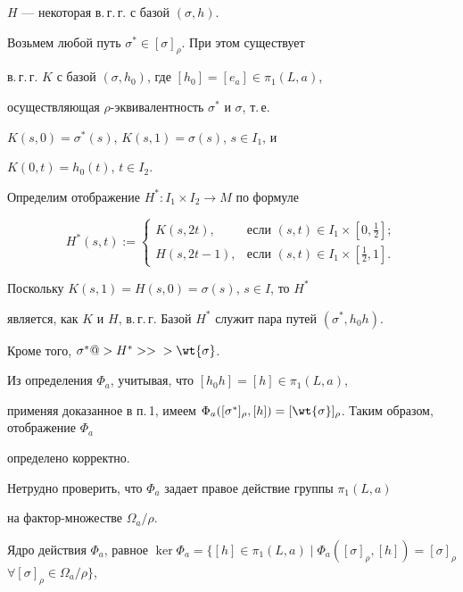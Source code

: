 \begin{pf}
$H$ --- некоторая в.\,г.\,г. с базой $(\sigma, h)$.


Возьмем любой путь $\sigma^*\in [\sigma]_{\rho}$. При этом существует


в.\,г.\,г. $K$ с базой $(\sigma, h_0)$, где $[h_0]=[e_a]\in\pi_1(L,a)$,


осуществляющая $\rho$-эквивалентность $\sigma^*$ и $\sigma$, т.\,е.


$K(s,0)=\sigma^*(s)$, $K(s,1)=\sigma(s)$, $s\in I_1$, и


$K(0,t)=h_0(t)$, $t\in I_2$.


Определим отображение $H^*: I_1\times I_2\to M$ по формуле


$$


H^*(s,t):=\begin{cases}


K(s,2t),& \text{если }(s,t)\in I_1\times [0,\frac{1}{2}];\\


H(s, 2t-1),& \text{если }(s,t)\in I_1\times [\frac{1}{2},1].


\end{cases}


$$


Поскольку $K(s,1)=H(s,0)=\sigma(s)$, $s\in I$, то $H^*$


является, как $K$ и $H$, в.\,г.\,г. Базой $H^*$ служит пара путей $(\sigma^*, h_0h)$.


Кроме того, $\sigma^*@> H^*>>{}>\wt{\sigma}$.


Из определения $\Phi_a$, учитывая, что $[h_0 h]=[h]\in \pi_1(L,a)$,


применяя доказанное в п.\,1, имеем $\Phi_a([\sigma^*]_{\rho},


[h])=[\wt{\sigma}]_{\rho}$. Таким образом, отображение $\Phi_a$


определено корректно.





Нетрудно проверить, что $\Phi_a$ задает правое действие группы $\pi_1(L,a)$


на фактор-множестве $\Omega_a/\rho$.


\end{pf}





Ядро действия $\Phi_a$, равное $\ker\Phi_a=\{[h]\in\pi_1(L,a) \mid


\Phi_a ([\sigma]_{\rho},[h])=[\sigma]_{\rho}$ $\forall[\sigma]_{\rho}\in\Omega_a/\rho\}$,



